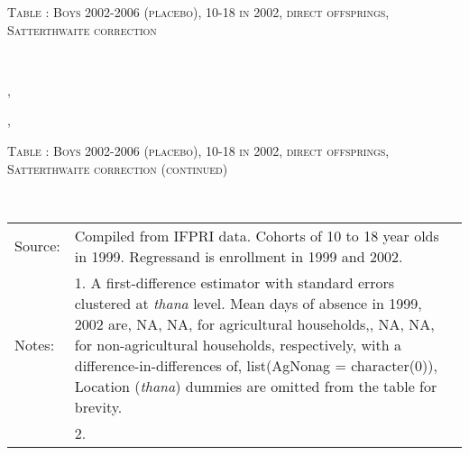 \begin{table}\hfil\textsc{\footnotesize Table \thetable: Boys 2002-2006 (placebo), 10-18 in 2002, direct offsprings, Satterthwaite correction\label{zEm.1999.10.sameN}}\\\setlength{\tabcolsep}{1pt}\renewcommand{\arraystretch}{.675}\hspace{-2em}\hfil{}\\\renewcommand{\arraystretch}{1}\end{table}, \addtocounter{table}{-1}, \begin{table}\hfil\textsc{\footnotesize Table \thetable: Boys 2002-2006 (placebo), 10-18 in 2002, direct offsprings, Satterthwaite correction (continued)\label{zEm.1999.10.sameN}}\\\setlength{\tabcolsep}{1pt}\renewcommand{\arraystretch}{.675}\hspace{-2em}\hfil{}\\\renewcommand{\arraystretch}{1}\hfil\begin{tabular}{>{\hfill\scriptsize}p{1cm}<{}>{\scriptsize}p{12cm}<{\hfill}} Source:& Compiled from IFPRI data. Cohorts of 10 to 18 year olds in 1999. Regressand is enrollment in 1999 and 2002. \\[-1ex] Notes:& 1. A first-difference estimator with standard errors clustered at \textit{thana} level. Mean days of absence in 1999, 2002 are, NA, NA, for agricultural households,, NA, NA, for non-agricultural households, respectively, with a difference-in-differences of, list(AgNonag = character(0)), Location (\textit{thana}) dummies are omitted from the table for brevity. \\ & 2.   \end{tabular} \end{table}




